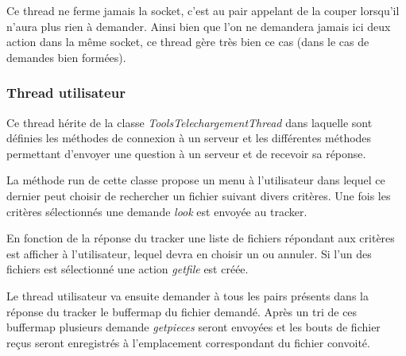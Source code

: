 Ce thread ne ferme jamais la socket, c'est au pair appelant de la
couper lorsqu'il n'aura plus rien à demander. Ainsi bien que l'on ne
demandera jamais ici deux action dans la même socket, ce thread gère
très bien ce cas (dans le cas de demandes bien formées).


\subsubsection{Thread utilisateur}
Ce thread hérite de la classe \textit{ToolsTelechargementThread} dans
laquelle sont définies les méthodes de connexion à un serveur et les
différentes méthodes permettant d'envoyer une question à un serveur et
de recevoir sa réponse.

La méthode run de cette classe propose un menu à l'utilisateur dans
lequel ce dernier peut choisir de rechercher un fichier suivant divers
critères. Une fois les critères sélectionnés une demande \textit{look}
est envoyée au tracker. 

En fonction de la réponse du tracker une liste de fichiers répondant
aux critères est afficher à l'utilisateur, lequel devra en choisir un
ou annuler. Si l'un des fichiers est sélectionné une action
\textit{getfile} est créée.


Le thread utilisateur va ensuite demander à tous les pairs présents
dans la réponse du tracker le buffermap du fichier demandé. Après un
tri de ces buffermap plusieurs demande \textit{getpieces} seront
envoyées et les bouts de fichier reçus seront enregistrés à l'emplacement
correspondant du fichier convoité.


